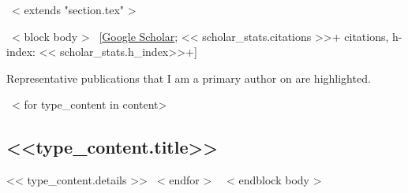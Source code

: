 ~< extends "section.tex" >~

~< block body >~
\vspace{-8.2mm}\hspace{30mm}[\href{https://scholar.google.com/citations?user=<< scholar_id >>}{\textcolor{note_highlight}{Google Scholar}};
<< scholar_stats.citations >>+ citations, h-index: << scholar_stats.h_index>>+]\vspace{3mm}


Representative publications that I am a primary author on are
\colorbox{tab_highlight}{highlighted.}



~< for type_content in content>~
  \subsection{<<type_content.title>>}
  << type_content.details >>
~< endfor >~
~< endblock body >~